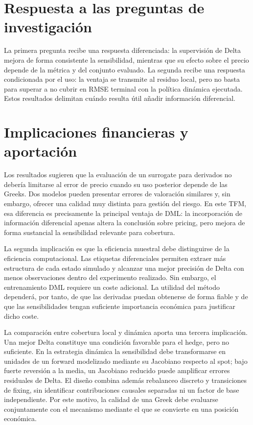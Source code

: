 \section{Respuesta a las preguntas de investigación}
\label{sec:respuesta_preguntas}

La primera pregunta recibe una respuesta diferenciada: la supervisión de Delta
mejora de forma consistente la sensibilidad, mientras que su efecto sobre el precio
depende de la métrica y del conjunto evaluado. La segunda recibe una respuesta
condicionada por el uso: la ventaja se transmite al residuo local, pero no basta
para superar a no cubrir en RMSE terminal con la política dinámica ejecutada.
Estos resultados delimitan cuándo resulta útil añadir información diferencial.

\section{Implicaciones financieras y aportación}
\label{sec:implicaciones_financieras}

Los resultados sugieren que la evaluación de un surrogate para derivados no debería limitarse al error de precio cuando su uso posterior depende de las Greeks. Dos modelos pueden presentar errores de valoración similares y, sin embargo, ofrecer una calidad muy distinta para gestión del riesgo. En este TFM, esa diferencia es precisamente la principal ventaja de DML: la incorporación de información diferencial apenas altera la conclusión sobre pricing, pero mejora de forma sustancial la sensibilidad relevante para cobertura.

La segunda implicación es que la eficiencia muestral debe distinguirse de la eficiencia computacional. Las etiquetas diferenciales permiten extraer más estructura de cada estado simulado y alcanzar una mejor precisión de Delta con menos observaciones dentro del experimento realizado. Sin embargo, el entrenamiento DML requiere un coste adicional. La utilidad del método dependerá, por tanto, de que las derivadas puedan obtenerse de forma fiable y de que las sensibilidades tengan suficiente importancia económica para justificar dicho coste.

La comparación entre cobertura local y dinámica aporta una tercera implicación. Una mejor Delta constituye una condición favorable para el hedge, pero no suficiente. En la estrategia dinámica la sensibilidad debe transformarse en unidades de un forward modelizado mediante su Jacobiano respecto al spot; bajo fuerte reversión a la media, un Jacobiano reducido puede amplificar errores residuales de Delta. El diseño combina además rebalanceo discreto y transiciones de fixing, sin identificar contribuciones causales separadas ni un factor de base independiente. Por este motivo, la calidad de una Greek debe evaluarse conjuntamente con el mecanismo mediante el que se convierte en una posición económica.

